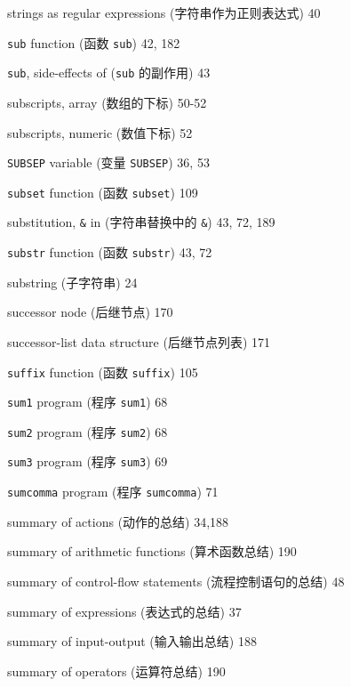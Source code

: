 \begin{multicols}{2}
\hangindent=2pc  strings as regular expressions
(字符串作为正则表达式) 40

\hangindent=2pc  \verb'sub' function (函数 \verb'sub') 42, 182

\hangindent=2pc  \verb'sub', side-effects of (\verb'sub'
的副作用) 43

\hangindent=2pc  subscripts, array (数组的下标) 50-52

\hangindent=2pc  subscripts, numeric (数值下标) 52

\hangindent=2pc  \verb'SUBSEP' variable (变量 \verb'SUBSEP') 36, 53

\hangindent=2pc  \verb'subset' function (函数 \verb'subset') 109

\hangindent=2pc  substitution, \verb'&' in (字符串替换中的
\verb'&') 43, 72, 189

\hangindent=2pc  \verb'substr' function (函数 \verb'substr') 43, 72

\hangindent=2pc  substring (子字符串) 24

\hangindent=2pc  successor node (后继节点) 170

\hangindent=2pc  successor-list data structure (后继节点列表) 171

\hangindent=2pc  \verb'suffix' function (函数 \verb'suffix') 105

\hangindent=2pc  \verb'sum1' program (程序 \verb'sum1') 68

\hangindent=2pc  \verb'sum2' program (程序 \verb'sum2') 68

\hangindent=2pc  \verb'sum3' program (程序 \verb'sum3') 69

\hangindent=2pc  \verb'sumcomma' program (程序 \verb'sumcomma') 71

\hangindent=2pc  summary of actions (动作的总结) 34,188

\hangindent=2pc  summary of arithmetic functions (算术函数总结) 190

\hangindent=2pc  summary of control-flow statements
(流程控制语句的总结) 48

\hangindent=2pc  summary of expressions (表达式的总结) 37

\hangindent=2pc  summary of input-output (输入输出总结) 188

\hangindent=2pc  summary of operators (运算符总结) 190


\end{multicols}
